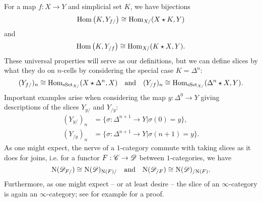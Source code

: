 \documentclass[../../thesis.tex]{subfiles}
\begin{document}
For a map $f\colon X\to Y$ and simplicial set $K$, we have bijections
\[
    \mathrm{Hom}\left(K, Y_{f /}\right) \cong \mathrm{Hom}_{X /}(X \star K, Y)
\]
and
\[
    \mathrm{Hom}\left(K, Y_{/ f}\right) \cong \mathrm{Hom}_{X /}(K \star X, Y).
\]
These universal properties will serve as our definitions, but we can define slices by what they do on $n$-cells by considering the special case $K=\Delta^n$:
\[
    (Y_{f/})_n \cong \mathrm{Hom}_{\mathrm{sSet}_{X/}}(X\star \Delta^n, X) \quad \text{and} \quad    (Y_{/f})_n \cong \mathrm{Hom}_{\mathrm{sSet}_{X/}}(\Delta^n\star X, Y).
\]
Important examples arise when considering the map $y\colon \Delta^0\to Y$ giving descriptions of the slices $Y_{y/}$ and $Y_{/y}$:
\begin{align*}
    (Y_{y/})_n & = \{ \sigma \colon \Delta^{n+1} \to Y | \sigma(0) = y\},   \\
    (Y_{/y})_n & = \{ \sigma \colon \Delta^{n+1} \to Y | \sigma(n+1) = y\}.
\end{align*}
As one might expect, the nerve of a $1$-category commute with taking slices as it does for joins, i.e. for a functor $F: \mathscr{C} \to \mathscr{D}$ between $1$-categories, we have
\[
    \mathrm{N}(\mathscr{D}_{F/}) \cong \mathrm{N}(\mathscr{D})_{\mathrm{N}(F)/}\quad \text{and} \quad \mathrm{N}(\mathscr{D}_{/F}) \cong \mathrm{N}(\mathscr{D})_{/\mathrm{N}(F)}.
\]
Furthermore, as one might expect -- or at least desire -- the slice of an $\infty$-category is again an $\infty$-category; see for example \cite[Proposition 30.2.]{Rezk} for a proof.
\end{document}
